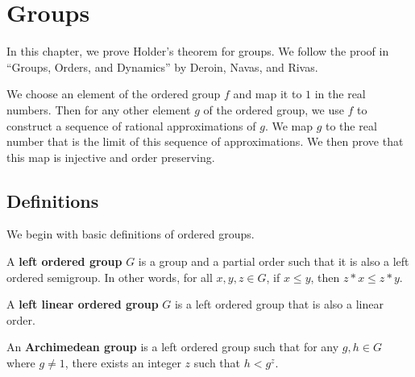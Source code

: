 
%

\chapter{Groups}
In this chapter, we prove Holder's theorem for groups. We follow the proof in
``Groups, Orders, and Dynamics'' by Deroin, Navas, and Rivas.

We choose an element of the ordered group $f$ and map it to $1$ in the real numbers.
Then for any other element $g$ of the ordered group, we use $f$ to construct
a sequence of rational approximations of $g$. We map $g$ to the real number that
is the limit of this sequence of approximations. We then prove that this map is
injective and order preserving.

\section{Definitions}
We begin with basic definitions of ordered groups.

\begin{definition}\label{def:LeftOrderedGroup}
    \leanok
    A \textbf{left ordered group} $G$ is a group and a partial order such that
    it is also a left ordered semigroup. In other words, 
    for all $x, y, z \in G$,
    if $x \le y$, then $z * x \le z * y$.
\end{definition}

\begin{definition}\label{def:LeftLinearOrderedGroup}
    \leanok
    A \textbf{left linear ordered group} $G$ is a left ordered group that is also a linear order.
\end{definition}

\begin{definition}\label{def:archimedean_group}
    \leanok
    An \textbf{Archimedean group} is a left ordered group such that
    for any $g, h \in G$ where $g \ne 1$, there exists an integer $z$
    such that $h < g^z$.
\end{definition}

